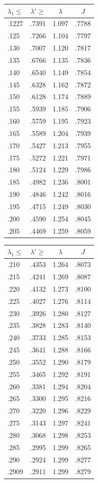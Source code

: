 \documentclass[12pt,psamsfonts]{amsart}
\theoremstyle{definition}
\theoremstyle{remark}
\numberwithin{equation}{section}
\begin{document}
\begin{table}
\begin{tabular}{l|c|c|c} 
 $\lambda_1 \leq$ & $\lambda' \geq$& $\lambda$ & $J$ \\ 
 \hline 
 .1227 &  .7391 &  1.097 &  .7788 \\ 
 .125 &  .7266 &  1.104 &  .7797 \\ 
 .130 &  .7007 &  1.120 &  .7817 \\ 
 .135 &  .6766 &  1.135 &  .7836 \\ 
 .140 &  .6540 &  1.149 &  .7854 \\ 
 .145 &  .6328 &  1.162 &  .7872 \\ 
 .150 &  .6128 &  1.174 &  .7889 \\ 
 .155 &  .5939 &  1.185 &  .7906 \\ 
 .160 &  .5759 &  1.195 &  .7923 \\ 
 .165 &  .5589 &  1.204 &  .7939 \\ 
 .170 &  .5427 &  1.213 &  .7955 \\ 
 .175 &  .5272 &  1.221 &  .7971 \\ 
 .180 &  .5124 &  1.229 &  .7986 \\ 
 .185 &  .4982 &  1.236 &  .8001 \\ 
 .190 &  .4846 &  1.242 &  .8016 \\ 
 .195 &  .4715 &  1.249 &  .8030 \\ 
 .200 &  .4590 &  1.254 &  .8045 \\ 
 .205 &  .4469 &  1.259 &  .8059 \\ 
 \end{tabular}
 \qquad
 \begin{tabular}{l|c|c|c} 
 $\lambda_1 \leq$ & $\lambda' \geq$& $\lambda$ & $J$ \\ 
 \hline 
 .210 &  .4353 &  1.264 &  .8073 \\ 
 .215 &  .4241 &  1.269 &  .8087 \\ 
 .220 &  .4132 &  1.273 &  .8100 \\ 
 .225 &  .4027 &  1.276 &  .8114 \\ 
 .230 &  .3926 &  1.280 &  .8127 \\ 
 .235 &  .3828 &  1.283 &  .8140 \\ 
 .240 &  .3733 &  1.285 &  .8153 \\ 
 .245 &  .3641 &  1.288 &  .8166 \\ 
 .250 &  .3552 &  1.290 &  .8179 \\ 
 .255 &  .3465 &  1.292 &  .8191 \\ 
 .260 &  .3381 &  1.294 &  .8204 \\ 
 .265 &  .3300 &  1.295 &  .8216 \\ 
 .270 &  .3220 &  1.296 &  .8229 \\ 
 .275 &  .3143 &  1.297 &  .8241 \\ 
 .280 &  .3068 &  1.298 &  .8253 \\ 
 .285 &  .2995 &  1.299 &  .8265 \\ 
 .290 &  .2924 &  1.299 &  .8277 \\ 
 .2909 &  .2911 &  1.299 &  .8279 \\ 
\end{tabular}



\end{table}
\end{document}
